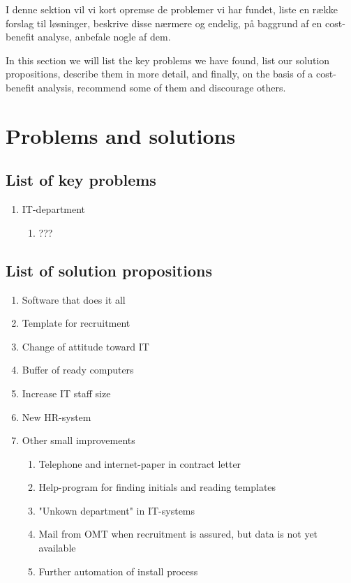 I denne sektion vil vi kort opremse de problemer vi har fundet, liste en række forslag til løsninger, beskrive disse nærmere og endelig, på baggrund af en cost-benefit analyse, anbefale nogle af dem.

In this section we will list the key problems we have found, list our solution propositions, describe them in more detail, and finally, on the basis of a cost-benefit analysis, recommend some of them and discourage others.

\section{Problems and solutions}
\subsection{List of key problems}
\begin{enumerate}
\item IT-department
	\begin{enumerate}
	\item ???
	\end{enumerate}
\end{enumerate}

\subsection{List of solution propositions}
\begin{enumerate}
\item Software that does it all
\item Template for recruitment
\item Change of attitude toward IT
\item Buffer of ready computers
\item Increase IT staff size
\item New HR-system
\item Other small improvements
	\begin{enumerate}
	\item Telephone and internet-paper in contract letter
	\item Help-program for finding initials and reading templates
	\item "Unkown department" in IT-systems
	\item Mail from OMT when recruitment is assured, but data is not yet available
	\item Further automation of install process
	\end{enumerate}
\end{enumerate}

